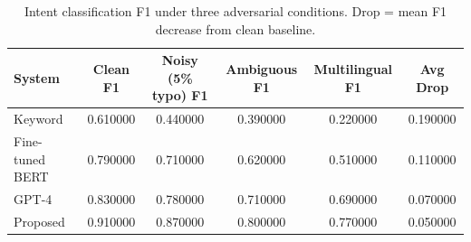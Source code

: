 \begin{table}
\caption{Intent classification F1 under three adversarial conditions. Drop = mean F1 decrease from clean baseline.}
\label{tab:tab05_robustness}
\begin{tabular}{lccccc}
\toprule
System & Clean F1 & Noisy (5\% typo) F1 & Ambiguous F1 & Multilingual F1 & Avg Drop \\
\midrule
Keyword & 0.610000 & 0.440000 & 0.390000 & 0.220000 & 0.190000 \\
Fine-tuned BERT & 0.790000 & 0.710000 & 0.620000 & 0.510000 & 0.110000 \\
GPT-4 & 0.830000 & 0.780000 & 0.710000 & 0.690000 & 0.070000 \\
Proposed & 0.910000 & 0.870000 & 0.800000 & 0.770000 & 0.050000 \\
\bottomrule
\end{tabular}
\end{table}
